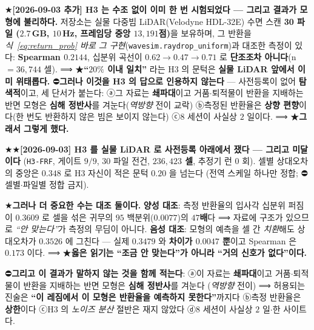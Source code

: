 \documentclass[11pt]{report}
\numberwithin{equation}{chapter}
\numberwithin{figure}{chapter}
\numberwithin{table}{chapter}
\begin{document}
★\textbf{[2026-09-03 추가] H3 는 수조 없이 이미 한 번 시험되었다 --- 그리고 결과가
모형에 불리하다.} 저장소는 실물 다중빔 LiDAR(Velodyne HDL-32E) 수면 스캔 \textbf{30 파일
($2.7$\,GB, $10$\,Hz, 프레임당 중앙 $13{,}191$점)}을 보유하며, 그 반환을
\emph{식~\ref{eq:return_prob} 바로 그 구현}(\texttt{wavesim.raydrop\_uniform})과 대조한
측정이 있다: \textbf{Spearman $0.2144$}, 십분위 곡선이 $0.62 \to 0.47 \to 0.71$ 로
\textbf{단조조차 아니다}(n $= 36{,}744$ 셀).
⟹ ★\textbf{``$20\%$ 이내 일치''} 라는 H3 의 문턱은 \textbf{실물 LiDAR 앞에서 이미 위태롭다.}
⛔\textbf{그러나 이것을 H3 의 답으로 인용하지 않는다} --- 사전등록이 없어 \textbf{탐색적}이고,
세 단서가 붙는다: ⓐ그 자료는 \textbf{쇄파대}이고 거품$\cdot$퇴적물이 반환을 지배하는 반면
모형은 \textbf{심해 정반사}를 겨눈다(\emph{역방향} 전이 교락) ⓑ측정된 반환율은
\textbf{상향 편향}이다(한 번도 반환하지 않은 빔은 보이지 않는다) ⓒ$8$ 세션이 사실상 $2$ 일이다.
⟹ ★\textbf{그래서 그렇게 했다.}

★★\textbf{[2026-09-03] H3 를 실물 LiDAR 로 사전등록 아래에서 쟀다 --- 그리고 미달이다}
(\texttt{H3-FRF}, 게이트 $9/9$, $30$ 파일 전건, \textbf{$236{,}423$ 셀}, 추정기 런 $0$ 회).
셀별 상대오차의 중앙은 \textbf{$0.348$} 로 H3 자신이 적은 문턱 \textbf{$0.20$} 을 넘는다
(전역 스케일 하나만 정합; ⛔셀별$\cdot$파일별 정합 금지).

★\textbf{그러나 더 중요한 수는 대조 둘이다.}
\textbf{양성 대조}: 측정 반환율의 입사각 십분위 퍼짐이 $0.3609$ 로 셀을 섞은 귀무의
$95$ 백분위($0.0077$)의 \textbf{$47$배}다 ⟹ 자료에 구조가 있으므로
\emph{``안 맞는다''}가 측정의 무딤이 아니다.
\textbf{음성 대조}: 모형의 예측을 셀 간 \emph{치환}해도 상대오차가 $0.3526$ 에 그친다
--- 실제 $0.3479$ 와 \textbf{차이가 $0.0047$ 뿐}이고 Spearman 은 $0.173$ 이다.
⟹ ★\textbf{옳은 읽기는 ``조금 안 맞는다''가 아니라 ``거의 신호가 없다''이다.}

⛔\textbf{그리고 이 결과가 말하지 않는 것을 함께 적는다}: ⓐ이 자료는 \textbf{쇄파대}이고
거품$\cdot$퇴적물이 반환을 지배하는 반면 모형은 \textbf{심해 정반사}를 겨눈다
(\emph{역방향} 전이) ⟹ 허용되는 진술은 \textbf{``이 레짐에서 이 모형은 반환율을 예측하지
못한다''}까지다 ⓑ측정 반환율은 \textbf{상한}이다 ⓒH3 의 \emph{노이즈 분산} 절반은
재지 않았다 ⓓ$8$ 세션이 사실상 $2$ 일$\cdot$한 사이트다.
\end{document}
